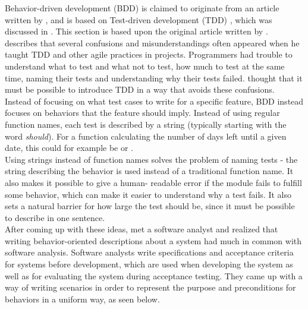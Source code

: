 Behavior-driven development (BDD) is claimed to originate from an
article written by \citet{web:dan_north}, and is based on Test-driven
development (TDD) \cite{wiki:bdd}, which was discussed in
. This section is based upon the original article written
by \citet{web:dan_north}.\\

\citeauthor{web:dan_north} describes that several confusions and
misunderstandings often appeared when he taught TDD and other agile
practices in projects. Programmers had trouble to understand what to
test and what not to test, how much to test at the same time, naming
their tests and understanding why their tests failed.
\citeauthor{web:dan_north} thought that it must be possible to introduce
TDD in a way that avoids these confusions.\\

Instead of focusing on what test cases to write for a specific feature,
BDD instead focuses on behaviors that the feature should imply. Instead
of using regular function names, each test is described by a string
(typically starting with the word \emph{should}). For a function
calculating the number of days left until a given date, this could for
example be  or
.\\

Using strings instead of function names solves the problem of naming
tests - the string describing the behavior is used instead of a
traditional function name. It also makes it possible to give a human-
readable error if the module fails to fulfill some behavior, which can
make it easier to understand why a test fails. It also sets a natural
barrier for how large the test should be, since it must be possible to
describe in one sentence.\\

After coming up with these ideas, \citeauthor{web:dan_north} met a
software analyst and realized that writing behavior-oriented
descriptions about a system had much in common with software analysis.
Software analysts write specifications and acceptance criteria for
systems before development, which are used when developing the system as
well as for evaluating the system during acceptance testing. They came
up with a way of writing scenarios in order to represent the purpose and
preconditions for behaviors in a uniform way, as seen below.\\

